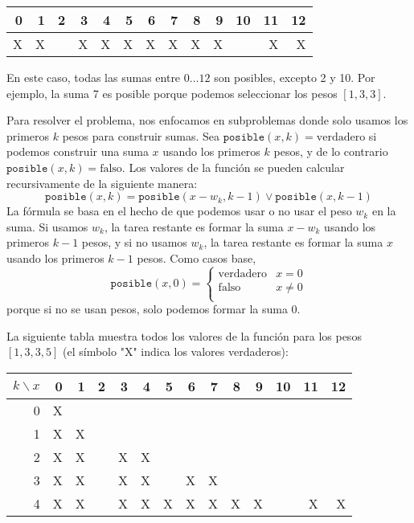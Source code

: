 \begin{center}
\begin{tabular}{rrrrrrrrrrrrr}
 0 & 1 & 2 & 3 & 4 & 5 & 6 & 7 & 8 & 9 & 10 & 11 & 12 \\
\hline
 X & X & & X & X & X & X & X & X & X & & X & X \\
\end{tabular}
\end{center}

En este caso, todas las sumas entre $0 \ldots 12$
son posibles, excepto 2 y 10.
Por ejemplo, la suma 7 es posible porque podemos
seleccionar los pesos $[1,3,3]$.

Para resolver el problema, nos enfocamos en subproblemas
donde solo usamos los primeros $k$ pesos
para construir sumas.
Sea $\texttt{posible}(x,k)=\textrm{verdadero}$ si
podemos construir una suma $x$
usando los primeros $k$ pesos,
y de lo contrario $\texttt{posible}(x,k)=\textrm{falso}$.
Los valores de la función se pueden calcular recursivamente de la siguiente manera:
\[ \texttt{posible}(x,k) = \texttt{posible}(x-w_k,k-1) \lor \texttt{posible}(x,k-1) \]
La fórmula se basa en el hecho de que podemos
usar o no usar el peso $w_k$ en la suma.
Si usamos $w_k$, la tarea restante es formar
la suma $x-w_k$ usando los primeros $k-1$ pesos,
y si no usamos $w_k$,
la tarea restante es formar la suma $x$
usando los primeros $k-1$ pesos.
Como casos base,
\begin{equation*}
    \texttt{posible}(x,0) = \begin{cases}
               \textrm{verdadero}    & x = 0\\
               \textrm{falso}   & x \neq 0 \\
           \end{cases}
\end{equation*}
porque si no se usan pesos,
solo podemos formar la suma 0.

La siguiente tabla muestra todos los valores de la función
para los pesos $[1,3,3,5]$ (el símbolo "X"
indica los valores verdaderos):

\begin{center}
\begin{tabular}{r|rrrrrrrrrrrrr}
$k \backslash x$ & 0 & 1 & 2 & 3 & 4 & 5 & 6 & 7 & 8 & 9 & 10 & 11 & 12 \\
\hline
 0 & X & \\
 1 & X & X \\
 2 & X & X & & X & X \\
 3 & X & X & & X & X & & X & X \\
 4 & X & X & & X & X & X & X & X & X & X & & X & X \\
\end{tabular}
\end{center}

